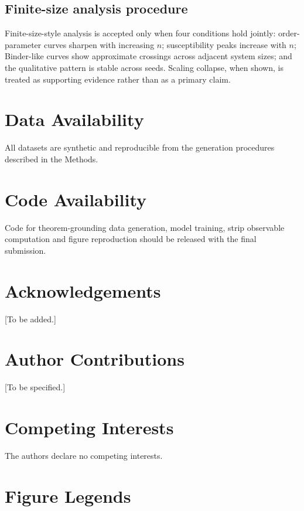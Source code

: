 \documentclass[11pt]{article}
\theoremstyle{definition}
\begin{document}
\subsection*{Finite-size analysis procedure}

Finite-size-style analysis is accepted only when four conditions hold jointly: order-parameter curves sharpen with increasing \(n\); susceptibility peaks increase with \(n\); Binder-like curves show approximate crossings across adjacent system sizes; and the qualitative pattern is stable across seeds. Scaling collapse, when shown, is treated as supporting evidence rather than as a primary claim.

\section*{Data Availability}

All datasets are synthetic and reproducible from the generation procedures described in the Methods.

\section*{Code Availability}

Code for theorem-grounding data generation, model training, strip observable computation and figure reproduction should be released with the final submission.

\section*{Acknowledgements}

[To be added.]

\section*{Author Contributions}

[To be specified.]

\section*{Competing Interests}

The authors declare no competing interests.




\clearpage
\section*{Figure Legends}
\end{document}
